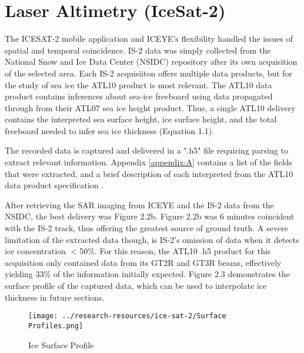 \section {Laser Altimetry (IceSat-2)}
The ICESAT-2 mobile application and ICEYE's flexibility handled the issues of spatial and temporal coincidence. IS-2 data was simply collected from the National Snow and Ice Data Center (NSIDC) repository after its own acquisition of the selected area. Each IS-2 acquisiiton offers multiple data products, but for the study of sea ice the ATL10 product is most relevant. The ATL10 data product contains inferences about sea-ice freeboard using data propagated through from their ATL07 sea ice height product. Thus, a single ATL10 delivery contains the interpreted sea surface height, ice surface height, and the total freeboard \cite{ICESat-2-ATL10-Product} needed to infer sea ice thickness (Equation 1.1).

The recorded data is captured and delivered in a ".h5" file requiring parsing to extract relevant information. Appendix \ref{appendix:A} contains a list of the fields that were extracted, and a brief description of each interpreted from the ATL10 data product specification \cite*{ICESat-2-ATL10-Product}.

After retrieving the SAR imaging from ICEYE and the IS-2 data from the NSIDC, the best delivery was Figure 2.2b. Figure 2.2b was 6 minutes coincident with the IS-2 track, thus offering the greatest source of ground truth. A severe limitation of the extracted data though, is IS-2's omission of data when it detects ice concentration $<$50\%. For this reason, the ATL10 .h5 product for this acquisition only contained data from its GT2R and GT3R beams, effectively yielding 33\% of the information initially expected. Figure 2.3 demonstrates the surface profile of the captured data, which can be used to interpolate ice thickness in future sections.

\begin{figure}[h!]
	\centering
	\texttt{[image: ../research-resources/ice-sat-2/Surface Profiles.png]}
	\caption[Ice Surface Profile of Acquired Data]{Ice Surface Profile}
	\label{fig:ice-thickness-gathered}
\end{figure}

